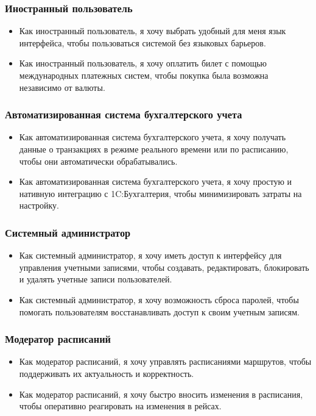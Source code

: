 \subsubsection*{Иностранный пользователь}
\begin{itemize}
    \item Как иностранный пользователь, я хочу выбрать удобный для меня язык интерфейса, чтобы пользоваться системой без языковых барьеров.
    \item Как иностранный пользователь, я хочу оплатить билет с помощью международных платежных систем, чтобы покупка была возможна независимо от валюты.
\end{itemize}

\subsubsection*{Автоматизированная система бухгалтерского учета}
\begin{itemize}
    \item Как автоматизированная система бухгалтерского учета, я хочу получать данные о транзакциях в режиме реального времени или по расписанию, чтобы они автоматически обрабатывались.
    \item Как автоматизированная система бухгалтерского учета, я хочу простую и нативную интеграцию с 1C:Бухгалтерия, чтобы минимизировать затраты на настройку.
\end{itemize}

\subsubsection*{Системный администратор}
\begin{itemize}
    \item Как системный администратор, я хочу иметь доступ к интерфейсу для управления учетными записями, чтобы создавать, редактировать, блокировать и удалять учетные записи пользователей.
    \item Как системный администратор, я хочу возможность сброса паролей, чтобы помогать пользователям восстанавливать доступ к своим учетным записям.
\end{itemize}

\subsubsection*{Модератор расписаний}
\begin{itemize}
    \item Как модератор расписаний, я хочу управлять расписаниями маршрутов, чтобы поддерживать их актуальность и корректность.
    \item Как модератор расписаний, я хочу быстро вносить изменения в расписания, чтобы оперативно реагировать на изменения в рейсах.
\end{itemize}
